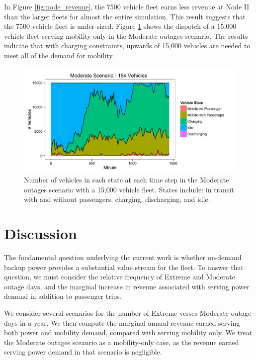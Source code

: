 \documentclass[journal]{IEEEtran}
\begin{document}
In Figure \ref{fig:node_revenue}, the 7500 vehicle fleet earns less revenue at Node II than the larger fleets for almost the entire simulation. This result suggests that the 7500 vehicle fleet is under-sized. Figure \ref{fig:time_moderate_15k} shows the dispatch of a 15,000 vehicle fleet serving mobility only in the Moderate outages scenario. The results indicate that with charging constraints, upwards of 15,000 vehicles are needed to meet all of the demand for mobility.

\begin{figure}[!htbp]
  \includegraphics[width=\linewidth]{plots/states-area-moderate-15k.pdf}
  \caption{Number of vehicles in each state at each time step in the Moderate outages scenario with a 15,000 vehicle fleet. States include: in transit with and without passengers, charging, discharging, and idle.}
  \label{fig:time_moderate_15k}
\end{figure}

\section{Discussion}

The fundamental question underlying the current work is whether on-demand backup power provides a substantial value stream for the fleet. To answer that question, we must consider the relative frequency of Extreme and Moderate outage days, and the marginal increase in revenue associated with serving power demand in addition to passenger trips.

We consider several scenarios for the number of Extreme verses Moderate outage days in a year. We then compute the marginal annual revenue earned serving both power and mobility demand, compared with serving mobility only. We treat the Moderate outages sceanrio as a mobility-only case, as the revenue earned serving power demand in that scenario is negligible. 
\end{document}
